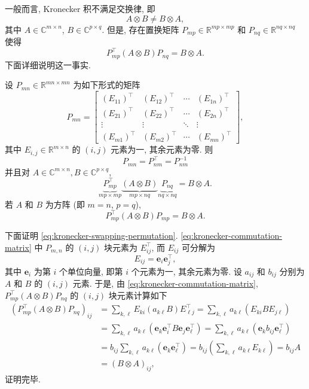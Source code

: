 {一般而言, Kronecker 积不满足交换律, 即}
\[A\otimes B\ne B\otimes A,\]
{其中 $A\in\mathbb{C}^{m\times n}$, $B\in\mathbb{C}^{p\times q}$. 但是, 存在置换矩阵 $P_{mp}\in\mathbb{R}^{mp\times mp}$ 和 $P_{nq}\in\mathbb{R}^{nq\times nq}$ 使得}
\[P_{mp}^{\top}(A\otimes B)P_{nq}=B\otimes A.\]
{下面详细说明这一事实.}
\begin{Theorem}\label{thm:kronecker-permutation}
{设 $P_{mn}\in\mathbb{R}^{mn\times mn}$ 为如下形式的矩阵}
\begin{equation}\label{eq:kronecker-commutation-matrix}
P_{mn}=\begin{bmatrix}
(E_{11})^{\top}&(E_{12})^{\top}&\cdots&(E_{1n})^{\top}\\
(E_{21})^{\top}&(E_{22})^{\top}&\cdots&(E_{2n})^{\top}\\
\vdots&\vdots&\ddots&\vdots\\
(E_{m1})^{\top}&(E_{m2})^{\top}&\cdots&(E_{mn})^{\top}
\end{bmatrix},
\end{equation}
{其中 $E_{i,j}\in\mathbb{R}^{m\times n}$ 的 $(i,j)$ 元素为一, 其余元素为零. 则}
\[P_{mn}=P_{nm}^{\top}=P_{nm}^{-1}\]
{并且对 $A\in\mathbb{C}^{m\times n},B\in\mathbb{C}^{p\times q}$,}
\begin{equation}\label{eq:kronecker-swapping-permutation}
\underbrace{P_{mp}^{\top}}_{mp\times mp}\underbrace{(A\otimes B)}_{mp\times nq}\underbrace{P_{nq}}_{nq\times nq}=B\otimes A.
\end{equation}
{若 $A$ 和 $B$ 为方阵 (即 $m=n$, $p=q$),}
\[P_{mp}^{\top}(A\otimes B)P_{mp}=B\otimes A.\]
\end{Theorem}
\begin{Proof}
{下面证明 \eqref{eq:kronecker-swapping-permutation}. \eqref{eq:kronecker-commutation-matrix} 中 $P_{m,n}$ 的 $(i,j)$ 块元素为 $E_{ij}^{\top}$, 而 $E_{ij}$ 可分解为}
\[E_{ij}=\boldsymbol{e}_i\boldsymbol{e}_j^{\top},\]
{其中 $\boldsymbol{e}_i$ 为第 $i$ 个单位向量, 即第 $i$ 个元素为一, 其余元素为零. 设 $a_{ij}$ 和 $b_{ij}$ 分别为 $A$ 和 $B$ 的 $(i,j)$ 元素. 于是, 由 \eqref{eq:kronecker-commutation-matrix}, $P_{mp}^{\top}(A\otimes B)P_{nq}$ 的 $(i,j)$ 块元素计算如下}
\[\begin{aligned}
\left(P_{mp}^{\top}(A\otimes B)P_{nq}\right)_{ij}
&=\sum_{k,\ell}E_{ki}(a_{k\ell}B)E_{\ell j}^{\top}=\sum_{k,\ell}a_{k\ell}\left(E_{ki}BE_{j\ell}\right)\\
&=\sum_{k,\ell}a_{k\ell}\left(\boldsymbol{e}_k\boldsymbol{e}_i^{\top}B\boldsymbol{e}_j\boldsymbol{e}_\ell^{\top}\right)
=\sum_{k,\ell}a_{k\ell}\left(\boldsymbol{e}_kb_{ij}\boldsymbol{e}_\ell^{\top}\right)\\
&=b_{ij}\sum_{k,\ell}a_{k\ell}\left(\boldsymbol{e}_k\boldsymbol{e}_\ell^{\top}\right)
=b_{ij}\left(\sum_{k,\ell}a_{k\ell}E_{k\ell}\right)=b_{ij}A\\
&=(B\otimes A)_{ij},
\end{aligned}\]
{证明完毕.}
\end{Proof}
